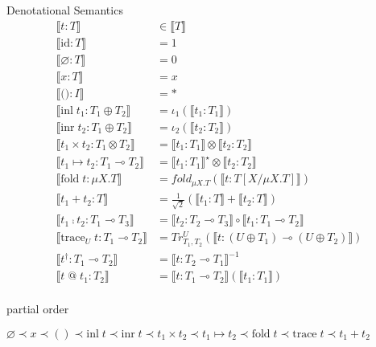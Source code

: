 \documentclass[8pt]{jsarticle}
\newcommand{\semantics}[1]{{\llbracket #1 \rrbracket}}
\begin{document}
\begin{itembox}[c]{Denotational Semantics}
  \begin{align*}
    \semantics{t:T}                                 &\in \semantics{T} \\
    \semantics{\text{id}:T}                         &= 1 \\
    \semantics{\varnothing:T}                       &= 0 \\ %
    \semantics{x:T}                                 &= x \\
    \semantics{\text{()}:I}                         &= \ast \\
    \semantics{\text{inl}\;t_1:T_1\oplus{}T_2}      &= \iota_1(\semantics{t_1:T_1}) \\
    \semantics{\text{inr}\;t_2:T_1\oplus{}T_2}      &= \iota_2(\semantics{t_2:T_2}) \\
    \semantics{t_1\times{}t_2:T_1\otimes{}T_2}      &= \semantics{t_1:T_1}\otimes\semantics{t_2:T_2} \\
    \semantics{t_1\mapsto{}t_2:T_1\multimap{}T_2}   &= \semantics{t_1:T_1}^\star\otimes\semantics{t_2:T_2} \\
    \semantics{\text{fold}\;t:\mu{X}.T}             &= fold_{\mu{X}.T}(\semantics{t:T[X/\mu{X}.T]}) \\
    \semantics{t_1+t_2:T}                           &= \tfrac{1}{\sqrt{2}}(\semantics{t_1:T}+\semantics{t_2:T}) \\
    \semantics{t_1\fcmp{}t_2:T_1\multimap{}T_3}     &= \semantics{t_2:T_2\multimap{}T_3}\circ\semantics{t_1:T_1\multimap{}T_2} \\
    \semantics{\text{trace}_U\;t:T_1\multimap{}T_2} &= Tr_{T_1,T_2}^U(\semantics{t:(U\oplus{}T_1)\multimap(U\oplus{}T_2)}) \\
    \semantics{t^\dagger:T_1\multimap{}T_2}         &= \semantics{t:T_2\multimap{}T_1}^{-1} \\
    \semantics{t\;\text{@}\;t_1:T_2}                &= \semantics{t:T_1\multimap{}T_2}(\semantics{t_1:T_1}) \\
  \end{align*}
\end{itembox}

\begin{itembox}[c]{partial order}
  \begin{center}
    $ \varnothing \prec x \prec () \prec \text{inl}\;t \prec \text{inr}\;t \prec t_1\times{}t_2 \prec t_1\mapsto{}t_2 \prec \text{fold}\;t \prec \text{trace}\;t  \prec t_1+t_2 $
  \end{center}
\end{itembox}
\end{document}
